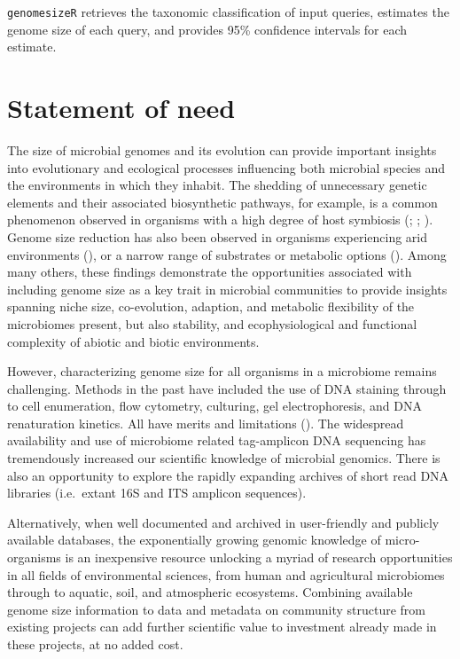 \documentclass[
]{article}
\begin{document}
\texttt{genomesizeR} retrieves the taxonomic classification of input
queries, estimates the genome size of each query, and provides 95\%
confidence intervals for each estimate.

\section{Statement of need}\label{statement-of-need}

The size of microbial genomes and its evolution can provide important
insights into evolutionary and ecological processes influencing both
microbial species and the environments in which they inhabit. The
shedding of unnecessary genetic elements and their associated
biosynthetic pathways, for example, is a common phenomenon observed in
organisms with a high degree of host symbiosis
(;
;
). Genome size reduction has also been observed in organisms
experiencing arid environments (), or a narrow range of substrates or metabolic options
(). Among many
others, these findings demonstrate the opportunities associated with
including genome size as a key trait in microbial communities to provide
insights spanning niche size, co-evolution, adaption, and metabolic
flexibility of the microbiomes present, but also stability, and
ecophysiological and functional complexity of abiotic and biotic
environments.

However, characterizing genome size for all organisms in a microbiome
remains challenging. Methods in the past have included the use of DNA
staining through to cell enumeration, flow cytometry, culturing, gel
electrophoresis, and DNA renaturation kinetics. All have merits and
limitations (). The
widespread availability and use of microbiome related tag-amplicon DNA
sequencing has tremendously increased our scientific knowledge of
microbial genomics. There is also an opportunity to explore the rapidly
expanding archives of short read DNA libraries (i.e.~extant 16S and ITS
amplicon sequences).

Alternatively, when well documented and archived in user-friendly and
publicly available databases, the exponentially growing genomic
knowledge of micro-organisms is an inexpensive resource unlocking a
myriad of research opportunities in all fields of environmental
sciences, from human and agricultural microbiomes through to aquatic,
soil, and atmospheric ecosystems. Combining available genome size
information to data and metadata on community structure from existing
projects can add further scientific value to investment already made in
these projects, at no added cost.
\end{document}
